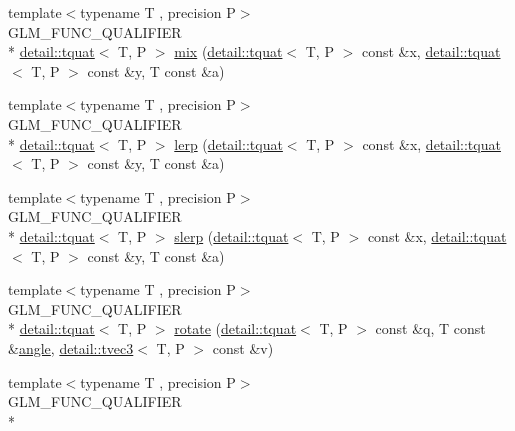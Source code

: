 \begin{DoxyCompactItemize}
\item 
{\footnotesize template$<$typename T , precision P$>$ }\\G\-L\-M\-\_\-\-F\-U\-N\-C\-\_\-\-Q\-U\-A\-L\-I\-F\-I\-E\-R \\*
\hyperlink{structglm_1_1detail_1_1tquat}{detail\-::tquat}$<$ T, P $>$ \hyperlink{group__gtc__quaternion_gafabf175ae3e2cd30bf58dc313321955a}{mix} (\hyperlink{structglm_1_1detail_1_1tquat}{detail\-::tquat}$<$ T, P $>$ const \&x, \hyperlink{structglm_1_1detail_1_1tquat}{detail\-::tquat}$<$ T, P $>$ const \&y, T const \&a)
\item 
{\footnotesize template$<$typename T , precision P$>$ }\\G\-L\-M\-\_\-\-F\-U\-N\-C\-\_\-\-Q\-U\-A\-L\-I\-F\-I\-E\-R \\*
\hyperlink{structglm_1_1detail_1_1tquat}{detail\-::tquat}$<$ T, P $>$ \hyperlink{group__gtc__quaternion_gafc1c989eaa2c786d34218b176f680fe0}{lerp} (\hyperlink{structglm_1_1detail_1_1tquat}{detail\-::tquat}$<$ T, P $>$ const \&x, \hyperlink{structglm_1_1detail_1_1tquat}{detail\-::tquat}$<$ T, P $>$ const \&y, T const \&a)
\item 
{\footnotesize template$<$typename T , precision P$>$ }\\G\-L\-M\-\_\-\-F\-U\-N\-C\-\_\-\-Q\-U\-A\-L\-I\-F\-I\-E\-R \\*
\hyperlink{structglm_1_1detail_1_1tquat}{detail\-::tquat}$<$ T, P $>$ \hyperlink{group__gtc__quaternion_ga7468a211a20ea56ea5cfb0625226868a}{slerp} (\hyperlink{structglm_1_1detail_1_1tquat}{detail\-::tquat}$<$ T, P $>$ const \&x, \hyperlink{structglm_1_1detail_1_1tquat}{detail\-::tquat}$<$ T, P $>$ const \&y, T const \&a)
\item 
{\footnotesize template$<$typename T , precision P$>$ }\\G\-L\-M\-\_\-\-F\-U\-N\-C\-\_\-\-Q\-U\-A\-L\-I\-F\-I\-E\-R \\*
\hyperlink{structglm_1_1detail_1_1tquat}{detail\-::tquat}$<$ T, P $>$ \hyperlink{group__gtc__quaternion_gaa9a8891f03d8f5373525c4b3159c1c73}{rotate} (\hyperlink{structglm_1_1detail_1_1tquat}{detail\-::tquat}$<$ T, P $>$ const \&q, T const \&\hyperlink{group__gtc__quaternion_ga23a3fc7ada5bbb665ff84c92c6e0542c}{angle}, \hyperlink{structglm_1_1detail_1_1tvec3}{detail\-::tvec3}$<$ T, P $>$ const \&v)
\item 
{\footnotesize template$<$typename T , precision P$>$ }\\G\-L\-M\-\_\-\-F\-U\-N\-C\-\_\-\-Q\-U\-A\-L\-I\-F\-I\-E\-R \\*

\end{DoxyCompactItemize}
